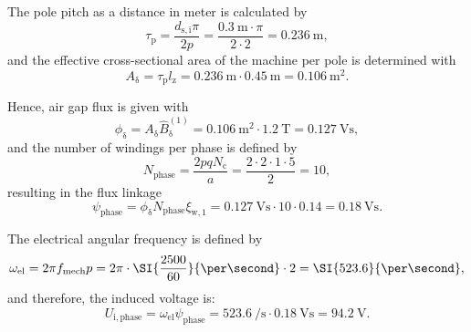 \begin{solutionblock}
    The pole pitch as a distance in meter is calculated by
    $$
        \tau_{\mathrm{p}} = \frac{d_{\mathrm{s,i}}\pi}{2p} = \frac{\SI{0.3}{\metre}\cdot \pi}{2\cdot 2} = \SI{0.236}{\metre},
    $$
    and the effective cross-sectional area of the machine per pole is determined with
    $$
        A_\updelta = \tau_{\mathrm{p}} l_{\mathrm{z}} = \SI{0.236}{\metre} \cdot \SI{0.45}{\metre} = \SI{0.106}{\metre^2}.
    $$

    Hence, air gap flux is given with
    $$
        \phi_\updelta = A_\updelta \hat{B}_\updelta^{(1)} = \SI{0.106}{\metre^2} \cdot \SI{1.2}{\tesla} = \SI{0.127}{\volt\second},
    $$
    and the number of windings per phase is defined by
    $$
        N_{\mathrm{phase}} = \frac{2pq N_{\mathrm{c}}}{a} = \frac{2\cdot 2\cdot 1\cdot 5}{2} = 10,
    $$
    resulting in the flux linkage
    $$
        \psi_{\mathrm{phase}} = \phi_\updelta N_{\mathrm{phase}} \xi_{\mathrm{w},1} = \SI{0.127}{\volt\second} \cdot 10 \cdot 0.14 = \SI{0.18}{\volt\second}.
    $$

\end{solutionblock}


\begin{solutionblock}
    The electrical angular frequency is defined by
    $$
        \omega_{\mathrm{el}} = 2 \pi f_{\mathrm{mech}} p = 2 \pi \cdot \SI{\frac{2500}{60}}{\per\second} \cdot 2 = \SI{523.6}{\per\second},
    $$
    and therefore, the induced voltage is:
    $$
        U_{\mathrm{i,phase}} = \omega_{\mathrm{el}} \psi_{\mathrm{phase}} = \SI{523.6}{\per\second} \cdot \SI{0.18}{\volt\second} = \SI{94.2}{\volt}.
    $$
\end{solutionblock}


